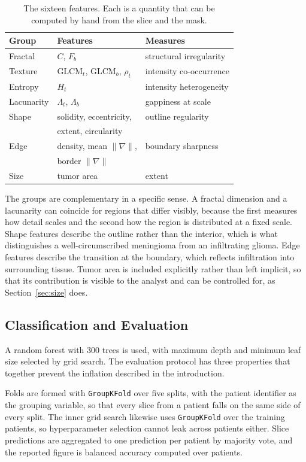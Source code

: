 \documentclass[journal]{IEEEtran}
\begin{document}
\begin{table}[t]
\centering
\caption{The sixteen features. Each is a quantity that can be computed by hand
from the slice and the mask.}
\label{tab:features}
\begin{tabular}{lll}
\toprule
Group & Features & Measures \\
\midrule
Fractal & $C$, $F_b$ & structural irregularity \\
Texture & $\text{GLCM}_t$, $\text{GLCM}_b$, $\rho_t$ & intensity co-occurrence \\
Entropy & $H_t$ & intensity heterogeneity \\
Lacunarity & $\Lambda_t$, $\Lambda_b$ & gappiness at scale \\
Shape & solidity, eccentricity, & outline regularity \\
        & extent, circularity & \\
Edge & density, mean $\|\nabla\|$, & boundary sharpness \\
     & border $\|\nabla\|$ & \\
Size & tumor area & extent \\
\bottomrule
\end{tabular}
\end{table}

The groups are complementary in a specific sense. A fractal dimension and a
lacunarity can coincide for regions that differ visibly, because the first
measures how detail scales and the second how the region is distributed at a
fixed scale. Shape features describe the outline rather than the interior, which
is what distinguishes a well-circumscribed meningioma from an infiltrating
glioma. Edge features describe the transition at the boundary, which reflects
infiltration into surrounding tissue. Tumor area is included explicitly rather
than left implicit, so that its contribution is visible to the analyst and can be
controlled for, as Section~\ref{sec:size} does.

\subsection{Classification and Evaluation}
\label{sec:eval}
A random forest with $300$ trees is used, with maximum depth and minimum leaf
size selected by grid search. The evaluation protocol has three properties that
together prevent the inflation described in the introduction.

Folds are formed with \texttt{GroupKFold} over five splits, with the patient
identifier as the grouping variable, so that every slice from a patient falls on
the same side of every split. The inner grid search likewise uses
\texttt{GroupKFold} over the training patients, so hyperparameter selection
cannot leak across patients either. Slice predictions are aggregated to one
prediction per patient by majority vote, and the reported figure is balanced
accuracy computed over patients.
\end{document}
